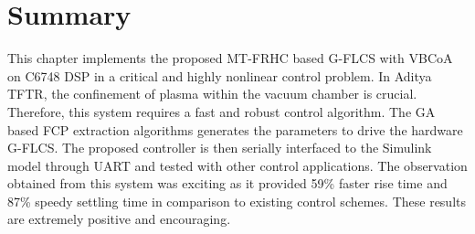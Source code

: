 \section{Summary}
This chapter implements the proposed MT-FRHC based G-FLCS with VBCoA on C6748 DSP in a critical and highly nonlinear control problem. In Aditya TFTR, the confinement of plasma within the vacuum chamber is crucial. Therefore, this system requires a fast and robust control algorithm. The GA based FCP extraction algorithms generates the parameters to drive the hardware G-FLCS. The proposed controller is then serially interfaced to the Simulink model through UART and tested with other control applications. The observation obtained from this system was exciting as it provided 59\% faster rise time and 87\% speedy settling time in comparison to existing control schemes. These results are extremely positive and encouraging.    
